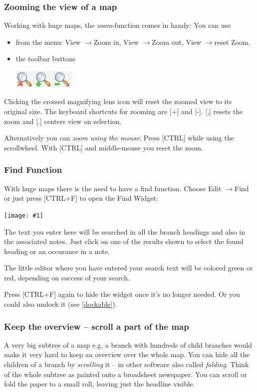 \documentclass[12pt,a4paper]{article}
\newcommand{\maximage}[1]{  
    \begin{center}
        \texttt{[image: \#1]} 
    \end{center}
}
\newcommand{\ra}{$\longrightarrow$}
\newcommand{\key}[1]{[#1]}
\begin{document}
\subsubsection*{Zooming the view of a map}
Working with huge maps, the {\em zoom}-function comes in handy: You can
use 
\begin{itemize}
    \item from the menu: View \ra Zoom in, View \ra Zoom out, View \ra reset Zoom.
    \item the toolbar buttons 
        \begin{center}
            \includegraphics[width=3cm]{images/zoom-buttons.png}
        \end{center}    
\end{itemize}   
Clicking the crossed magnifying lens icon will reset the zoomed view to
its original size.  The keyboard shortcuts for zooming are \key{+} and
\key{-}. \key{,} resets the zoom and \key{.} centers view on selection.

Alternatively you can {\em zoom using the mouse}: Press \key{CTRL} while
using the scrollwheel. With \key{CTRL} and middle-mouse you reset the
zoom.

\subsubsection*{Find Function} \label{findwindow}
With huge maps there is the need to have a
find function. Choose Edit \ra Find or just press \key{CTRL+F} to open
the Find Widget:
\begin{center}
    \maximage{images/find-window.png}
\end{center}    
The text you enter here will be searched in all the
branch headings and also in the associated notes. Just click on one of
the results shown to select the found heading or an occurance in a note.

The little editor where you have entered your search text will be
colored green or red, depending on success of your search.

Press \key{CTRL+F} again to hide the widget once it's no longer needed.
Or you could also undock it (see \ref{dockable}).

\subsubsection*{Keep the overview -- scroll a part of the map}
A very big subtree of a map e.g. a branch with hundreds of child
branches would make it very hard to keep an overview over the whole map.
You can hide all the children of a branch by {\em scrolling} it -- in
other software also called {\em folding}. Think of the whole subtree as
painted onto a broadsheet newspaper. You can scroll or fold the paper to
a small roll, leaving just the headline visible.
\end{document}
